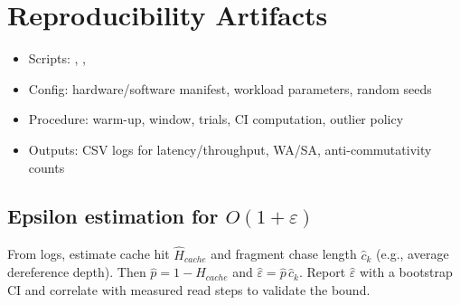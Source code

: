 \documentclass[10pt]{article}
\begin{document}
\section{Reproducibility Artifacts}\label{app:repro}
\begin{itemize}[nosep]
    \item Scripts: \texttt{}, \texttt{}, \texttt{}
    \item Config: hardware/software manifest, workload parameters, random seeds
    \item Procedure: warm-up, window, trials, CI computation, outlier policy
    \item Outputs: CSV logs for latency/throughput, WA/SA, anti-commutativity counts
\end{itemize}

\subsection*{Epsilon estimation for $O(1{+}\varepsilon)$}
From logs, estimate cache hit $\hat H_{cache}$ and fragment chase length $\hat c_k$ (e.g., average dereference depth). Then $\hat p=1-\hat H_{cache}$ and $\hat\varepsilon=\hat p\,\hat c_k$. Report $\hat\varepsilon$ with a bootstrap CI and correlate with measured read steps to validate the bound.
\end{document}

